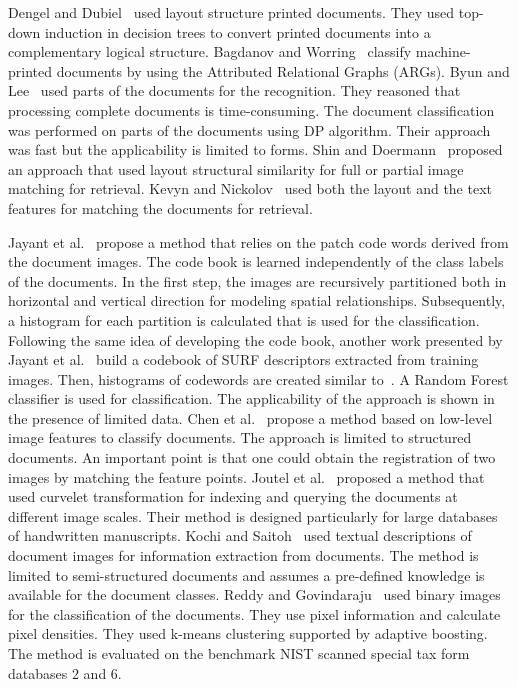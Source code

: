 \documentclass[conference]{IEEEtran}
\begin{document}
Dengel and Dubiel~\cite{doclass_Dengel95} used layout structure printed documents. They used top-down induction in decision trees to convert printed documents into a complementary logical structure.
Bagdanov and Worring~\cite{doclass_Bagdanov2001} classify machine-printed documents by using the Attributed Relational Graphs (ARGs).
Byun and Lee~\cite{doclass_Byun2000} used parts of the documents for the recognition. They reasoned that processing complete documents is time-consuming. The document classification was performed on parts of the documents using DP algorithm. Their approach was fast but the applicability is limited to forms. Shin and Doermann~\cite{doclass_shin} proposed an approach that used layout structural similarity for full or partial image matching for retrieval. 
Kevyn and Nickolov~\cite{Collins-thompson02aclustering-based} used both the layout and the text features for matching the documents for retrieval. 

Jayant et al.~\cite{doclass_Kumar12} propose a method that relies on the patch code words derived from the document images. The code book is learned independently of the class labels of the documents. In the first step, the images are recursively partitioned both in horizontal and vertical direction for modeling spatial relationships. Subsequently, a histogram for each partition is calculated that is used for the classification.
Following the same idea of developing the code book, another work presented by Jayant et al.~\cite{doclass_Kumar14} build a codebook of SURF descriptors extracted from training images. Then, histograms of codewords are created similar to~\cite{doclass_Kumar12}. A Random Forest classifier is used for classification. The applicability of the approach is shown in the presence of limited data.
Chen et al.~\cite{doclass_Chen12} propose a method based on low-level image features to classify documents. The approach is limited to structured documents. An important point is that one could obtain the registration of two images by matching the feature points.
Joutel et al.~\cite{doclass_Joutel2007} proposed a method that used curvelet transformation for indexing and querying the documents at different image scales. Their method is designed particularly for large databases of handwritten manuscripts. Kochi and Saitoh~\cite{doclass_Kochi99} used textual descriptions of document images for information extraction from documents. The method is limited to semi-structured documents and assumes a pre-defined knowledge is available for the document classes.
Reddy and Govindaraju~\cite{doclass_umamaheswara08} used binary images for the classification of the documents. They use pixel information and calculate pixel densities.  They used k-means clustering supported by adaptive boosting. The method is evaluated on the benchmark NIST scanned special tax form databases $2$ and $6$.
\end{document}
